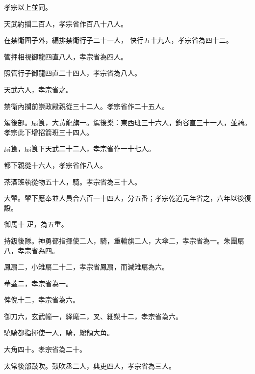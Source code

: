 \begin{pinyinscope}
 孝宗以上並同。



 天武約攔二百人，孝宗省作百八十八人。



 在禁衛圍子外，編排禁衛行子二十一人，
 快行五十九人，孝宗省為四十二。



 管押相視御龍四直八人，孝宗省為四人。



 照管行子御龍四直二十四人，孝宗省為八人。



 天武六人，孝宗省之。



 禁衛內攔前崇政殿親從三十二人。孝宗省作二十五人。



 駕後部。扇筤，大黃龍旗一。駕後樂：東西班三十六人，鈞容直三十一人，並騎。孝宗此下增招箭班三十四人。



 扇筤，扇筤下天武二十二人，孝宗省作一十七人。



 都下親從十六人，孝宗省作八人。



 茶酒班執從物五十人，騎。孝宗省為三十人。



 大輦。輦下應奉並人員合六百一十四人，分五番；孝宗乾道元年省之，六年以後復設。



 御馬十
 疋，為五重。



 持鈒後隊。神勇都指揮使二人，騎，重輪旗二人，大傘二，孝宗省為一。朱團扇八，孝宗省為四。



 鳳扇二，小雉扇二十二，孝宗省鳳扇，而減雉扇為六。



 華蓋二，孝宗省為一。



 俾倪十二，孝宗省為六。



 御刀六，玄武幢一，絳麾二，叉、細槊十二，孝宗省為六。



 驍騎都指揮使一人，騎，總領大角。



 大角四十。孝宗省為二十。



 太常後部鼓吹。鼓吹丞二人，典吏四人，孝宗省為三人。




\end{pinyinscope}

